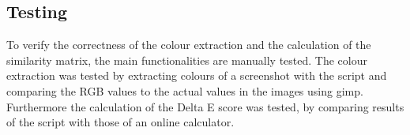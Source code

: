 


\newpage

\subsection{Testing}
\label{testing}
To verify the correctness of the colour extraction and the calculation of the similarity matrix, the main functionalities are manually tested. The colour extraction was tested by extracting colours of a screenshot with the script and comparing the RGB values to the actual values in the images using gimp. Furthermore the calculation of the Delta E score was tested, by comparing results of the script with those of an online calculator. 

